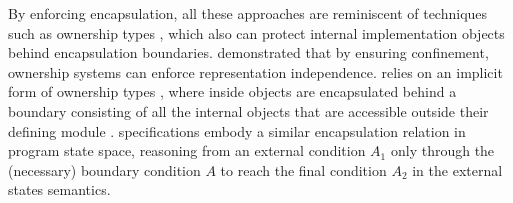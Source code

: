 





By enforcing encapsulation, %
all these approaches are reminiscent of techniques such as
ownership types \cite{ownalias,NobPotVitECOOP98},
which also can 
protect internal implementation objects behind 
encapsulation boundaries.  \cite{Banerjee:2005,encaps} demonstrated that by
ensuring confinement, ownership
systems can enforce representation independence.
\Nec relies on an implicit form of ownership types \cite{confined},
where inside objects are encapsulated behind a boundary 
consisting of all the internal objects that are accessible outside their
defining module \cite{TAME2003}.  
%
% 
%
%
\Nec specifications embody a similar encapsulation
relation in program state space, \eg reasoning
from an external condition $A_1$ only through the (necessary) boundary
condition $A$ to reach the final condition $A_2$ in the external
states semantics.





